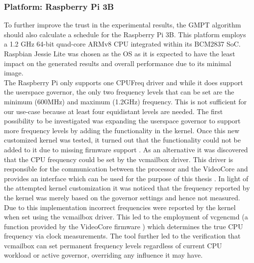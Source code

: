 \subsubsection{Platform: Raspberry Pi 3B}
To further improve the trust in the experimental results, the GMPT algorithm should also calculate a schedule for the Raspberry Pi 3B. This platform employs a 1.2 GHz 64-bit quad-core ARMv8 CPU integrated within its BCM2837 SoC. Raspbian Jessie Lite was chosen as the OS as it is expected to have the least impact on the generated results and overall performance due to its minimal image.\\
 \hspace*{0.5ex}\hspace{0.5ex} The Raspberry Pi only supports one CPUFreq driver and while it does support the userspace governor, the only two frequency levels that can be set are the minimum (600MHz) and maximum (1.2GHz) frequency. This is not sufficient for our use-case because at least four equidistant levels are needed. The first possibility to be investigated was expanding the userspace governor to support more frequency levels by adding the functionality in the kernel. Once this new customized kernel was tested, it turned out that the functionality could not be added to it due to missing firmware support \cite{Robingroppe2016}. As an alternative it was discovered that the CPU frequency could be set by the vcmailbox driver. This driver is responsible for the communication between the processor and the VideoCore and provides an interface which can be used for the purpose of this thesis \cite{vcmailbox}. In light of the attempted kernel customization it was noticed that the frequency reported by the kernel was merely based on the governor settings and hence not measured. Due to this implementation incorrect frequencies were reported by the kernel when set using the vcmailbox driver. This led to the employment of vcgencmd (a function provided by the VideoCore firmware \cite{vcgencmd}) which determines the true CPU frequency via clock measurements. The tool further led to the verification that vcmailbox can set permanent frequency levels regardless of current CPU workload or active governor, overriding any influence it may have.
